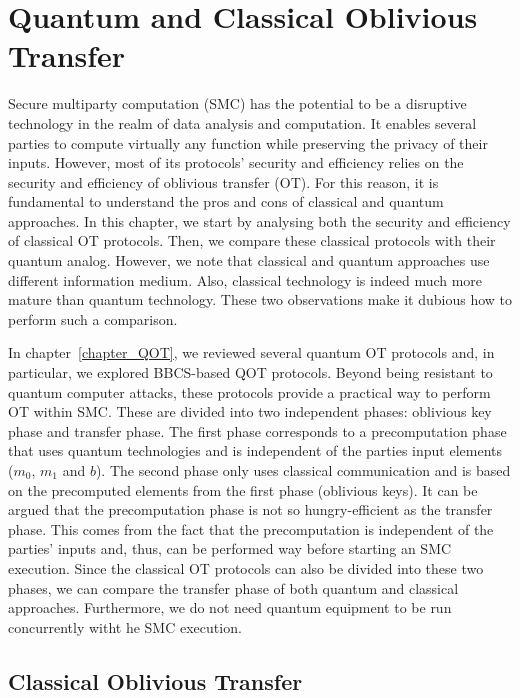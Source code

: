 


%

\chapter{Quantum and Classical Oblivious Transfer}

Secure multiparty computation (SMC) has the potential to be a disruptive technology in the realm of data analysis and computation. It enables several parties to compute virtually any function while preserving the privacy of their inputs. However, most of its protocols’ security and efficiency relies on the security and efficiency of oblivious transfer (OT). For this reason, it is fundamental to understand the pros and cons of classical and quantum approaches. In this chapter, we start by analysing both the security and efficiency of classical OT protocols. Then, we compare these classical protocols with their quantum analog. However, we note that classical and quantum approaches use different information medium. Also, classical technology is indeed much more mature than quantum technology. These two observations make it dubious how to perform such a comparison. 

In chapter~\ref{chapter_QOT}, we reviewed several quantum OT protocols and, in particular, we explored BBCS-based QOT protocols. Beyond being resistant to quantum computer attacks, these protocols provide a practical way to perform OT within SMC. These are divided into two independent phases: oblivious key phase and transfer phase. The first phase corresponds to a precomputation phase that uses quantum technologies and is independent of the parties input elements ($m_0$, $m_1$ and $b$). The second phase only uses classical communication and is based on the precomputed elements from the first phase (oblivious keys). It can be argued that the precomputation phase is not so hungry-efficient as the transfer phase. This comes from the fact that the precomputation is independent of the parties' inputs and, thus, can be performed way before starting an SMC execution. Since the classical OT protocols can also be divided into these two phases, we can compare the transfer phase of both quantum and classical approaches. Furthermore, we do not need quantum equipment to be run concurrently witht he SMC execution.




\section{Classical Oblivious Transfer}


